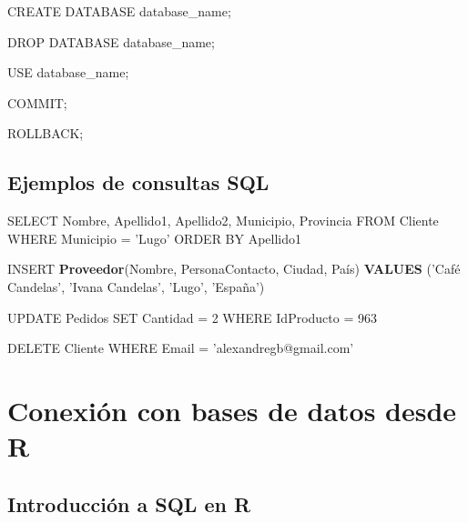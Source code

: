\documentclass[
]{book}
\newenvironment{Shaded}{\begin{snugshade}}{\end{snugshade}}
\newcommand{\DecValTok}[1]{\textcolor[rgb]{0.00,0.00,0.81}{#1}}
\newcommand{\KeywordTok}[1]{\textcolor[rgb]{0.13,0.29,0.53}{\textbf{#1}}}
\newcommand{\NormalTok}[1]{#1}
\newcommand{\StringTok}[1]{\textcolor[rgb]{0.31,0.60,0.02}{#1}}
\begin{document}
\begin{Shaded}
\begin{Highlighting}[]
\NormalTok{CREATE DATABASE database_name;}

\NormalTok{DROP DATABASE database_name;}

\NormalTok{USE database_name;}

\NormalTok{COMMIT;}

\NormalTok{ROLLBACK;}
\end{Highlighting}
\end{Shaded}

\hypertarget{ejemplos-de-consultas-sql}{%
\subsection{Ejemplos de consultas SQL}\label{ejemplos-de-consultas-sql}}

\begin{Shaded}
\begin{Highlighting}[]
\NormalTok{SELECT Nombre, Apellido1, Apellido2, Municipio, Provincia }
\NormalTok{FROM Cliente}
\NormalTok{WHERE Municipio =}\StringTok{ 'Lugo'}
\NormalTok{ORDER BY Apellido1}

\NormalTok{INSERT }\KeywordTok{Proveedor}\NormalTok{(Nombre, PersonaContacto, Ciudad, País)}
\KeywordTok{VALUES}\NormalTok{ (}\StringTok{'Café Candelas'}\NormalTok{, }\StringTok{'Ivana Candelas'}\NormalTok{, }\StringTok{'Lugo'}\NormalTok{, }\StringTok{'España'}\NormalTok{)}

\NormalTok{UPDATE Pedidos}
\NormalTok{SET Cantidad =}\StringTok{ }\DecValTok{2}
\NormalTok{WHERE IdProducto =}\StringTok{ }\DecValTok{963}

\NormalTok{DELETE Cliente}
\NormalTok{WHERE Email =}\StringTok{ 'alexandregb@gmail.com'}
\end{Highlighting}
\end{Shaded}

\hypertarget{conexiuxf3n-con-bases-de-datos-desde-r}{%
\section{Conexión con bases de datos desde R}\label{conexiuxf3n-con-bases-de-datos-desde-r}}

\hypertarget{introducciuxf3n-a-sql-en-r}{%
\subsection{Introducción a SQL en R}\label{introducciuxf3n-a-sql-en-r}}
\end{document}
